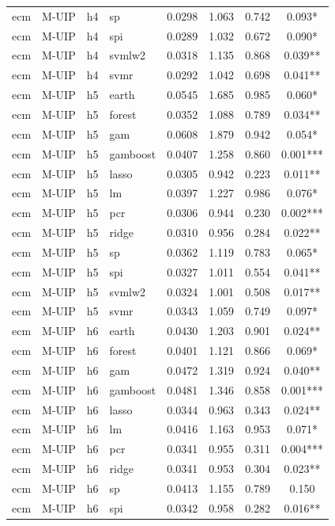 \begin{ThreePartTable}
\begin{longtable}[t]{llclcccc}
ecm & M-UIP & h4 & sp & 0.0298 & 1.063 & 0.742 & 0.093*\\
ecm & M-UIP & h4 & spi & 0.0289 & 1.032 & 0.672 & 0.090*\\
ecm & M-UIP & h4 & svmlw2 & 0.0318 & 1.135 & 0.868 & 0.039**\\
ecm & M-UIP & h4 & svmr & 0.0292 & 1.042 & 0.698 & 0.041**\\
\addlinespace
ecm & M-UIP & h5 & earth & 0.0545 & 1.685 & 0.985 & 0.060*\\
ecm & M-UIP & h5 & forest & 0.0352 & 1.088 & 0.789 & 0.034**\\
ecm & M-UIP & h5 & gam & 0.0608 & 1.879 & 0.942 & 0.054*\\
ecm & M-UIP & h5 & gamboost & 0.0407 & 1.258 & 0.860 & 0.001***\\
ecm & M-UIP & h5 & lasso & 0.0305 & 0.942 & 0.223 & 0.011**\\
ecm & M-UIP & h5 & lm & 0.0397 & 1.227 & 0.986 & 0.076*\\
ecm & M-UIP & h5 & pcr & 0.0306 & 0.944 & 0.230 & 0.002***\\
ecm & M-UIP & h5 & ridge & 0.0310 & 0.956 & 0.284 & 0.022**\\
ecm & M-UIP & h5 & sp & 0.0362 & 1.119 & 0.783 & 0.065*\\
ecm & M-UIP & h5 & spi & 0.0327 & 1.011 & 0.554 & 0.041**\\
ecm & M-UIP & h5 & svmlw2 & 0.0324 & 1.001 & 0.508 & 0.017**\\
ecm & M-UIP & h5 & svmr & 0.0343 & 1.059 & 0.749 & 0.097*\\
\addlinespace
ecm & M-UIP & h6 & earth & 0.0430 & 1.203 & 0.901 & 0.024**\\
ecm & M-UIP & h6 & forest & 0.0401 & 1.121 & 0.866 & 0.069*\\
ecm & M-UIP & h6 & gam & 0.0472 & 1.319 & 0.924 & 0.040**\\
ecm & M-UIP & h6 & gamboost & 0.0481 & 1.346 & 0.858 & 0.001***\\
ecm & M-UIP & h6 & lasso & 0.0344 & 0.963 & 0.343 & 0.024**\\
ecm & M-UIP & h6 & lm & 0.0416 & 1.163 & 0.953 & 0.071*\\
ecm & M-UIP & h6 & pcr & 0.0341 & 0.955 & 0.311 & 0.004***\\
ecm & M-UIP & h6 & ridge & 0.0341 & 0.953 & 0.304 & 0.023**\\
ecm & M-UIP & h6 & sp & 0.0413 & 1.155 & 0.789 & 0.150\\
ecm & M-UIP & h6 & spi & 0.0342 & 0.958 & 0.282 & 0.016**\\

\end{longtable}
\end{ThreePartTable}

